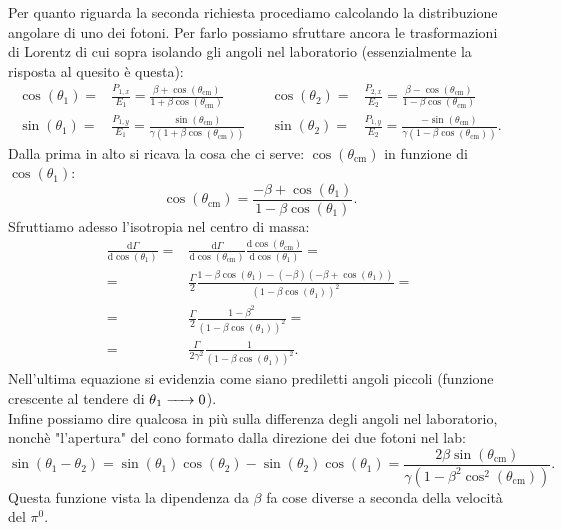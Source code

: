 Per quanto riguarda la seconda richiesta procediamo calcolando la distribuzione angolare di uno dei fotoni.
Per farlo possiamo sfruttare ancora le trasformazioni di Lorentz di cui sopra isolando gli angoli nel laboratorio (essenzialmente la risposta al quesito è questa):
\begin{align*}
	\cos\left(\theta_1\right)=&\frac{P_{1,x}}{E_1}=\frac{\beta+\cos\left(\theta_{\text{cm}}\right)}{1+\beta\cos\left(\theta_{\text{cm}}\right)}\quad&  
	\cos\left(\theta_2\right)=&\frac{P_{2,x}}{E_2}=\frac{\beta-\cos\left(\theta_{\text{cm}}\right)}{1-\beta\cos\left(\theta_{\text{cm}}\right)} \\  
	\sin\left(\theta_1\right)=&\frac{P_{1,y}}{E_1}=\frac{\sin\left(\theta_{\text{cm}}\right)}{\gamma\left(1+\beta\cos\left(\theta_{\text{cm}}\right)\right)}\quad&
	\sin\left(\theta_2\right)=&\frac{P_{1,y}}{E_2}=\frac{-\sin\left(\theta_{\text{cm}}\right)}{\gamma\left(1-\beta\cos\left(\theta_{\text{cm}}\right)\right)}
.\end{align*}
Dalla prima in alto si ricava la cosa che ci serve: $\cos\left( \theta_{\text{cm}} \right)$ in funzione di $\cos\left( \theta_1 \right)$:
\[
	\cos\left( \theta_{\text{cm}} \right) = \frac{-\beta + \cos\left( \theta_1 \right) }{1 - \beta\cos\left( \theta_1 \right) }
.\] 
Sfruttiamo adesso l'isotropia nel centro di massa:
\begin{align*}
	\frac{\text{d}\Gamma}{\text{d}\cos\left( \theta_{1} \right) } =&
	\frac{\mbox{d}\Gamma}{\mbox{d}\cos\left(\theta_{\text{cm}}\right)}\frac{\mbox{d}\cos\left(\theta_{\text{cm}}\right)}{\mbox{d}\cos\left(\theta_1\right)}=\\
	=&\frac{\Gamma}{2}\frac{1-\beta\cos\left(\theta_1\right)-(-\beta)(-\beta+\cos(\theta_1))}{\left(1-\beta\cos(\theta_1)\right)^2} =\\
	=& \frac{\Gamma}{2}\frac{1-\beta^2}{\left( 1-\beta\cos\left(\theta_1\right)\right)^2}=\\
	=&\frac{\Gamma}{2\gamma^2}\frac{1}{\left(1-\beta\cos(\theta_1)\right)^2}
.\end{align*}
Nell'ultima equazione si evidenzia come siano prediletti angoli piccoli (funzione crescente al tendere di $\ce{\ce{\theta_1} -> 0 }$).\\
Infine possiamo dire qualcosa in più sulla differenza degli angoli nel laboratorio, nonchè "l'apertura" del cono formato dalla direzione dei due fotoni nel lab:
\[
	\sin\left( \theta_1-\theta_2 \right) = \sin\left( \theta_1 \right) \cos\left( \theta_2 \right) -\sin\left( \theta_2 \right) \cos\left( \theta_1 \right) =
	\frac{2 \beta\sin\left( \theta_{\text{cm}} \right) }{\gamma\left( 1-\beta^2\cos^2\left(\theta_{\text{cm}}\right)\right) }
.\]
Questa funzione vista la dipendenza da $\beta$ fa cose diverse a seconda della velocità del $\pi^0$. 

